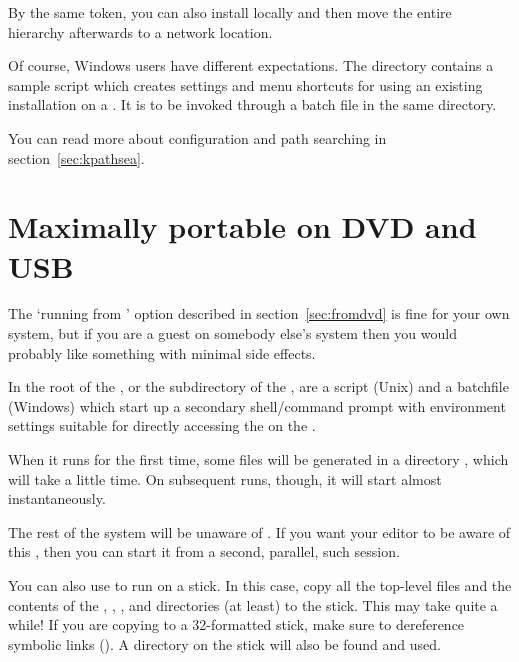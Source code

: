 \documentclass{article}
\begin{document}
By the same token, you can also install \TL{} locally and then move
the entire hierarchy afterwards to a network location.

Of course, Windows users have different expectations. The directory
 contains a
sample script  which creates settings and
menu shortcuts for using an existing \TL{} installation on a
. It is to be invoked through a batch file
 in the same directory.

You can read more about \TL{} configuration and path searching in
section~\ref{sec:kpathsea}.

\section{Maximally portable \protect\TL{} on DVD and USB}
\label{sec:portable-unix}

The `running from \DVD{}' option described in
section~\ref{sec:fromdvd} is fine for your own system, but if you
are a guest on somebody else's system then you would probably like
something with minimal side effects.

In the root of the \TL{} \DVD, or the  subdirectory of
the \TK{} \DVD, are a  script (Unix) and a
 batchfile (Windows) which start up a
secondary shell\slash command prompt with environment settings suitable
for directly accessing the \TL{} on the \DVD.

When it runs for the first time, some files will be generated in a
directory , which will take a little time.
On subsequent runs, though, it will start almost instantaneously.

The rest of the system will be unaware of \TL. If you want your editor
to be aware of this \TL, then you can start it from a second, parallel,
such  session.

You can also use  to run \TL{} on a
 stick.  In this case, copy all the top-level files and
the contents of the , ,
, and  directories (at least) to
the stick. This may take quite a while! If you are copying to a
32-formatted  stick, make sure to dereference
symbolic links ().  A  directory on
the stick will also be found and used.
\end{document}
